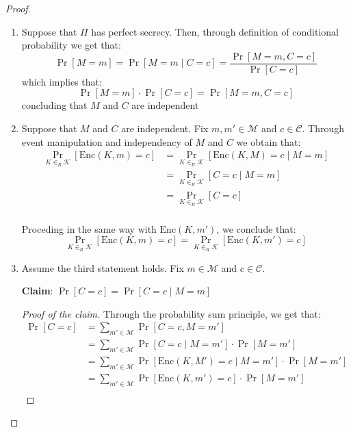 \documentclass[a4paper, 12pt]{report}
\begin{document}
    \begin{proof}
        \quad

        \begin{enumerate}
            \item[1. $\implies$ 2.] Suppose that $\Pi$ has perfect secrecy. Then, through definition of conditional probability we get that:
            \[\Pr[M = m] = \Pr[M = m \mid C = c] = \frac{\Pr[M = m, C = c]}{\Pr[C = c]}\]
            which implies that:
            \[\Pr[M = m] \cdot \Pr[C = c] = \Pr[M = m, C = c]\]
            concluding that $M$ and $C$ are independent

            \item[2. $\implies$ 3.] Suppose that $M$ and $C$ are independent. Fix $m, m' \in \mathcal{M}$ and $c \in \mathcal{C}$. Through event manipulation and independency of $M$ and $C$ we obtain that:
            \[\begin{split}
                \Pr_{K \in_R \mathcal{K}}[\mathrm{Enc}(K,m) = c] &= \Pr_{K \in_R \mathcal{K}}[\mathrm{Enc}(K,M) = c \mid M = m] \\
                &= \Pr_{K \in_R \mathcal{K}}[C = c \mid M = m]\\
                &= \Pr_{K \in_R \mathcal{K}}[C = c]\\
            \end{split}\]

            Proceding in the same way with $\mathrm{Enc}(K,m')$, we conclude that:
            \[\Pr_{K \in_R \mathcal{K}}[\mathrm{Enc}(K,m) = c] = \Pr_{K \in_R \mathcal{K}}[\mathrm{Enc}(K,m') = c]\]

            \item[3. $\implies$ 1.] Assume the third statement holds. Fix $m \in \mathcal{M}$ and $c \in \mathcal{C}$.
            
            \textbf{Claim}: $\Pr[C = c] = \Pr[C = c \mid M = m]$

            \begin{proof}[Proof of the claim]
                Through the probability sum principle, we get that:
                \[\begin{split}
                    \Pr[C = c] &= \sum_{m' \in \mathcal{M}} \Pr[C = c, M = m'] \\
                    &= \sum_{m' \in \mathcal{M}} \Pr[C = c \mid M = m'] \cdot \Pr[M = m'] \\
                    &= \sum_{m' \in \mathcal{M}} \Pr[\mathrm{Enc}(K,M') = c \mid M = m'] \cdot \Pr[M = m'] \\
                    &= \sum_{m' \in \mathcal{M}} \Pr[\mathrm{Enc}(K,m') = c] \cdot \Pr[M = m'] \\
                \end{split}\]


\end{proof}
\end{enumerate}
\end{proof}
\end{document}
